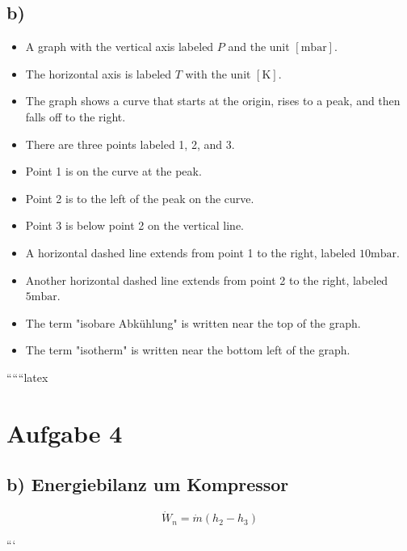 

\subsection*{b)}

\begin{itemize}
    \item A graph with the vertical axis labeled \( P \) and the unit \([ \text{mbar} ]\).
    \item The horizontal axis is labeled \( T \) with the unit \([ \text{K} ]\).
    \item The graph shows a curve that starts at the origin, rises to a peak, and then falls off to the right.
    \item There are three points labeled 1, 2, and 3.
    \item Point 1 is on the curve at the peak.
    \item Point 2 is to the left of the peak on the curve.
    \item Point 3 is below point 2 on the vertical line.
    \item A horizontal dashed line extends from point 1 to the right, labeled \( 10 \text{mbar} \).
    \item Another horizontal dashed line extends from point 2 to the right, labeled \( 5 \text{mbar} \).
    \item The term "isobare Abkühlung" is written near the top of the graph.
    \item The term "isotherm" is written near the bottom left of the graph.
\end{itemize}

``````latex


\section*{Aufgabe 4}

\subsection*{b) Energiebilanz um Kompressor}

\[
\dot{W}_n = \dot{m} (h_2 - h_3)
\]

```